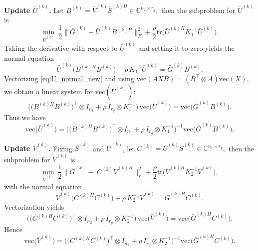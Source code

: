 \documentclass[a4paper,12pt]{article}
\numberwithin{equation}{section}
\numberwithin{algorithm}{section}
\theoremstyle{remark}
\theoremstyle{definition}
\begin{document}
\noindent\textbf{Update $\bar U^{(k)}$.}
Let
\(
B^{(k)}=\bar V^{(k)}\bar S^{(k)H}\in\mathbb{C}^{n_2\times r_g},
\)
then the subproblem for $\bar U^{(k)}$ is
\[
\min_{\bar U^{(k)}}\
\frac{1}{2}\big\|\bar G^{(k)}-\bar U^{(k)}B^{(k)H}\big\|_F^2
+\frac{\rho}{2}\mathrm{tr}\!\big(\bar U^{(k)H}K_1^{-1}\bar U^{(k)}\big).
\]
Taking the derivative with respect to $\bar U^{(k)}$ and setting it to zero yields the normal equation
\begin{equation}
	\bar U^{(k)}\big(B^{(k)H}B^{(k)}\big)+\rho\,K_1^{-1}\bar U^{(k)}=\bar G^{(k)}B^{(k)}.
	\label{eq:U_normal_new}
\end{equation}
Vectorizing \eqref{eq:U_normal_new} and using $\mathrm{vec}(AXB)=(B^{\top}\otimes A)\mathrm{vec}(X)$, we obtain a linear system for $\mathrm{vec}(\bar U^{(k)})$:
\begin{equation}
	\Big(\big(B^{(k)H}B^{(k)}\big)^{\top}\otimes I_{n_1}+\rho\,I_{r_g}\otimes K_1^{-1}\Big)\,
	\mathrm{vec}\!\big(\bar U^{(k)}\big)
	=
	\mathrm{vec}\!\big(\bar G^{(k)}B^{(k)}\big).
	\label{eq:U_vec_system}
\end{equation}
Thus we have
\begin{equation}
	\mathrm{vec}\!\big(\bar U^{(k)}\big)
	=\Big(\big(B^{(k)H}B^{(k)}\big)^{\top}\otimes I_{n_1}+\rho\,I_{r_g}\otimes K_1^{-1}\Big)^{-1}
	\mathrm{vec}\!\big(\bar G^{(k)}B^{(k)}\big).
\end{equation}

\noindent\textbf{Update $\bar V^{(k)}$.}
Fixing $\bar S^{(k)}$ and $\bar U^{(k)}$, let
\(
C^{(k)}=\bar U^{(k)}\bar S^{(k)}\in\mathbb{C}^{n_1\times r_g},
\)
then the subproblem for $\bar V^{(k)}$ is
\[
\min_{\bar V^{(k)}}\
\frac{1}{2}\big\|\bar G^{(k)}-\;C^{(k)}\bar V^{(k)H}\big\|_F^2
+\frac{\rho}{2}\mathrm{tr}\!\big(\bar V^{(k)H}K_2^{-1}\bar V^{(k)}\big),
\]
with the normal equation
\begin{equation}
	\bar V^{(k)}\big(C^{(k)H}C^{(k)}\big)+\rho\,K_2^{-1}\bar V^{(k)}
	=\bar G^{(k)H}C^{(k)}.
	\label{eq:V_normal}
\end{equation}
Vectorization yields
\begin{equation}
	\Big(\big(C^{(k)H}C^{(k)}\big)^{\top}\otimes I_{n_2}+\rho\,I_{r_g}\otimes K_2^{-1}\Big)\,
	\mathrm{vec}\!\big(\bar V^{(k)}\big)
	=
	\mathrm{vec}\!\big(\bar G^{(k)H}C^{(k)}\big).
	\label{eq:V_vec_system}
\end{equation}
Hence
\begin{equation}\mathrm{vec}\!\big(\bar V^{(k)}\big)
	=\Big(\big(C^{(k)H}C^{(k)}\big)^{\top}\otimes I_{n_2}+\rho\,I_{r_g}\otimes K_2^{-1}\Big)^{-1}
	\mathrm{vec}\!\big(\bar G^{(k)H}C^{(k)}\big).
\end{equation}
\end{document}
